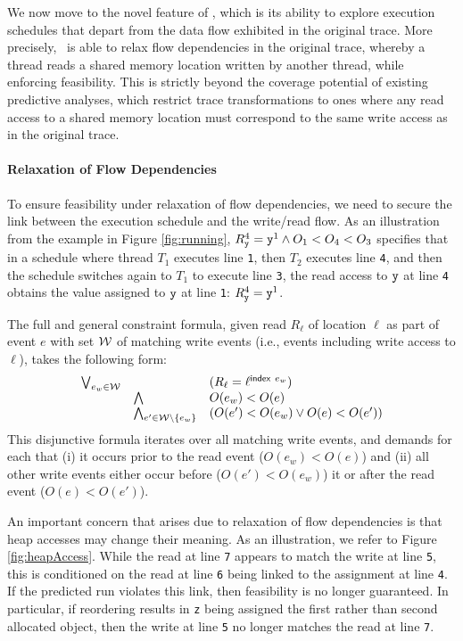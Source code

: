 We now move to the novel feature of \tool, which is its ability to explore execution schedules that depart from the data flow exhibited in the original trace. More precisely, \tool\ is able to relax flow dependencies in the original trace, whereby a thread reads a shared memory location written by another thread, while enforcing feasibility. This is strictly beyond the coverage potential of existing predictive analyses, which restrict trace transformations to ones where any read access to a shared memory location must correspond to the same write access as in the original trace.

\paragraph{Relaxation of Flow Dependencies}

To ensure feasibility under relaxation of flow dependencies, we need to secure the link between the execution schedule and the write/read flow. As an illustration from the example in Figure \ref{fig:running}, $R_{\tt y}^4={\tt y}^1 \wedge O_1 < O_4 < O_3$ specifies that in a schedule where thread $T_1$ executes line {\tt 1}, then $T_2$ executes line {\tt 4}, and then the schedule switches again to $T_1$ to execute line {\tt 3}, the read access to ${\tt y}$ at line {\tt 4} obtains the value assigned to ${\tt y}$ at line {\tt 1}: $R_{\tt y}^4={\tt y}^1$.

The full and general constraint formula, given read $R_{\ell}$ of location $\ell$ as part of event $e$ with set ${\cal W}$ of matching write events (i.e., events including write access to $\ell$), takes the following form:
$$
\begin{array}{rll}
\bigvee_{e_w \in {\cal W}} &  & (R_{\ell} = {\ell}^{{\sf index}\ e_w}) \\
&		\bigwedge 	&  O(e_w) < O(e) \\
&		\bigwedge_{e' \in {\cal W} \setminus \{ e_w \}} & (O(e') < O(e_w) \vee O(e) < O(e'))
\end{array}
$$
This disjunctive formula iterates over all matching write events, and demands for each that (i) it occurs prior to the read event ($O(e_w) < O(e)$) and (ii) all other write events either occur before ($O(e') < O(e_w)$) it or after the read event
($O(e) < O(e')$).

An important concern that arises due to relaxation of flow dependencies is that heap accesses may change their meaning. As an illustration, we refer to Figure \ref{fig:heapAccess}. While the read at line {\tt 7} appears to match the write at line {\tt 5}, this is conditioned on the read at line {\tt 6} being linked to the assignment at line {\tt 4}. If the predicted run violates this link, then feasibility is no longer guaranteed. In particular, if reordering results in {\tt z} being assigned the first rather than second allocated object, then the write at line {\tt 5} no longer matches the read at line {\tt 7}.
 

